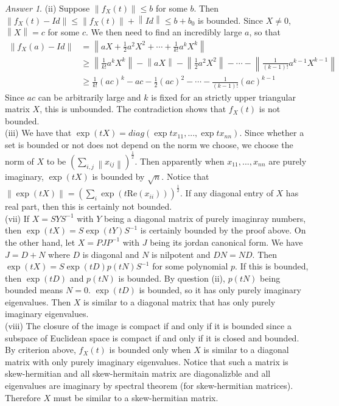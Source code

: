 \documentclass[10pt,a4paper]{article}
\theoremstyle{plain}
\theoremstyle{definition}
\theoremstyle{remark}
\newtheorem*{answer*}{Answer}
\newcommand{\<}{\langle}
\renewcommand{\>}{\rangle}
\newcommand{\norm}[1]{\left\lVert#1\right\rVert}
\begin{document}
\begin{answer*} \hfill

(ii) Suppose $\norm{f_X(t)} \leq b$ for some $b$. Then $\norm{f_X(t)-Id} \leq \norm{f_X(t)} + \norm{Id} \leq b+b_0 $ is bounded. Since $X\not = 0$, $\norm{X} = c$ for some $c$. We then need to find an incredibly large $a$, so that
\begin{align*}
\norm{f_X(a)-Id} &= \norm{aX+\frac{1}{2}a^2X^2+\cdots+\frac{1}{k!}a^kX^k} \\
&\geq \norm{\frac{1}{k!}a^kX^k} - \norm{aX}-\norm{\frac{1}{2}a^2X^2}-\cdots - \norm{\frac{1}{(k-1)!}a^{k-1}X^{k-1}}\\
&\geq \frac{1}{k!}(ac)^k - ac - \frac{1}{2}(ac)^2 - \cdots - \frac{1}{(k-1)!}(ac)^{k-1}
\end{align*}
Since $ac$ can be arbitrarily large and $k$ is fixed for an strictly upper triangular matrix $X$, this is unbounded. The contradiction shows that $f_X(t)$ is not bounded. \\

(iii) We have that $\exp(tX) = diag(\exp{tx_{11}},...,\exp{tx_{nn}})$. Since whether a set is bounded or not does not depend on the norm we choose, we choose the norm of $X$ to be $\left(\sum_{i,j} \norm{x_{ij}}\right)^{\frac{1}{2}}$. Then apparently when $x_{11},...,x_{nn}$ are purely imaginary, $\exp(tX)$ is bounded by $\sqrt{n}$. Notice that $\norm{\exp(tX)} = \left(\sum_{i} \exp(t\mathrm{Re}(x_{ii}))\right)^\frac{1}{2}$.
If any diagonal entry of $X$ has real part, then this is certainly not bounded.\\

(vii) If $X = SYS^{-1}$ with $Y$ being a diagonal matrix of purely imaginray numbers, then $\exp(tX) = S\exp(tY)S^{-1}$ is certainly bounded by the proof above. On the other hand, let $X = PJP^{-1}$ with $J$ being its jordan canonical form. We have $J = D+N$ where $D$ is diagonal and $N$ is nilpotent and $DN = ND$. Then $\exp(tX) = S\exp(tD)p(tN)S^{-1}$ for some polynomial $p$. If this is bounded, then $\exp(tD)$ and $p(tN)$ is bounded. By question (ii), $p(tN)$ being bounded means $N = 0$. $\exp(tD)$ is bounded, so it has only purely imaginary eigenvalues. Then $X$ is similar to a diagonal matrix that has only purely imaginary eigenvalues. \\

(viii) The closure of the image is compact if and only if it is bounded since a subspace of Euclidean space is compact if and only if it is closed and bounded. By criterion above, $f_X(t)$ is bounded only when $X$ is similar to a diagonal matrix with only purely imaginary eigenvalues. Notice that such a matrix is skew-hermitian and all skew-hermitain matrix are diagonalizble and all eigenvalues are imaginary by spectral theorem (for skew-hermitian matrices). Therefore $X$ must be similar to a skew-hermitian matrix.\\
\end{answer*}
\end{document}
